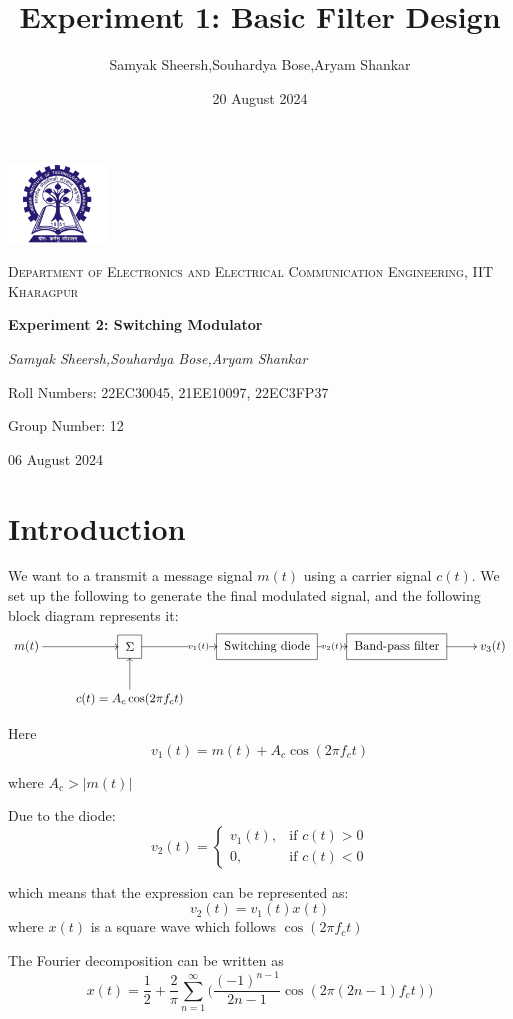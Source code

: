 \documentclass{article}
\title{Experiment 1: Basic Filter Design}
\author{Samyak Sheersh,Souhardya Bose,Aryam Shankar}
\date{20 August 2024}
\begin{document}
\begin{titlepage}
    \centering
    \includegraphics[width=0.2\textwidth]{KGP_logo.png}\par\vspace{1cm}
    {\scshape\LARGE Department of Electronics and Electrical Communication Engineering, IIT Kharagpur\par}
    \vspace{1cm}
    {\huge\bfseries Experiment 2: Switching Modulator\par}
    \vspace{1.5cm}
    {\Large\itshape Samyak Sheersh,Souhardya Bose,Aryam Shankar\par}
    \vfill
    {\large Roll Numbers: 22EC30045, 21EE10097, 22EC3FP37\par}
    {\large Group Number: 12\par}
    \vfill
    {\large 06 August 2024\par}
\end{titlepage}


\section{Introduction}
We want to a transmit a message signal $m(t)$ using a carrier signal $c(t)$. We set up the following to generate the final modulated signal, and the following block diagram represents it:
\[\xymatrix{
    m(t) \ar[r] & *++[F]{\Sigma} \ar[r]|{v_1(t)} & *++[F]{\text{Switching diode}} \ar[r]|{v_2(t)} & *++[F]{\text{Band-pass filter}} \ar[r] & v_3(t)\\
& c(t)=A_c \cos(2\pi f_c t) \ar[u]
}\]

Here $$v_1(t) = m(t)+A_c \cos(2\pi f_c t)$$

where $A_c >|m(t)|$


Due to the diode:
\begin{equation}
    v_2(t)=\begin{cases}
        v_1(t),& \text{if } c(t) > 0\\
        0, & \text{if } c(t) < 0
    \end{cases}
\end{equation}


which means that the expression can be represented as:
\begin{equation}
    v_2(t)=v_1(t)x(t)
\end{equation}
where $x(t)$ is a square wave which follows $\cos(2\pi f_c t)$

The Fourier decomposition can be written as 
\begin{equation}
  x(t) = \frac{1}{2}+\frac{2}{\pi}\sum_{n=1}^\infty \Bigg(\frac{(-1)^{n-1}}{2n-1}\cos(2\pi(2n-1)f_c t)\Bigg)
\end{equation}
\end{document}
